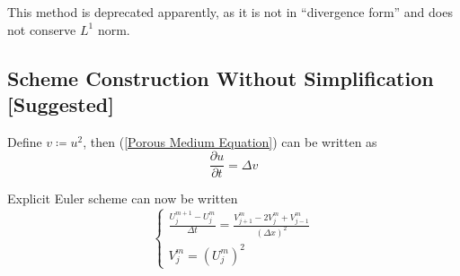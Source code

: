 \documentclass[a4paper]{article}
\begin{document}
This method is deprecated apparently, as it is not in ``divergence form'' and does not conserve $L^1$ norm.

\subsection{Scheme Construction Without Simplification [Suggested]}
Define $v \coloneqq u^2$, then (\ref{Porous Medium Equation}) can be written as
\begin{equation}
    \frac{\partial u}{\partial t} = \Delta v
\end{equation}

Explicit Euler scheme can now be written
\begin{equation}
    \begin{cases}
        \frac{U_j^{m+1} - U_j^m}{\Delta t} = \frac{V_{j+1}^m - 2 V_j^m + V_{j-1}^m}{\left( \Delta x \right)^2} \\
        V_j^m = \left( U_j^m \right)^2
    \end{cases}
\end{equation}
\end{document}
